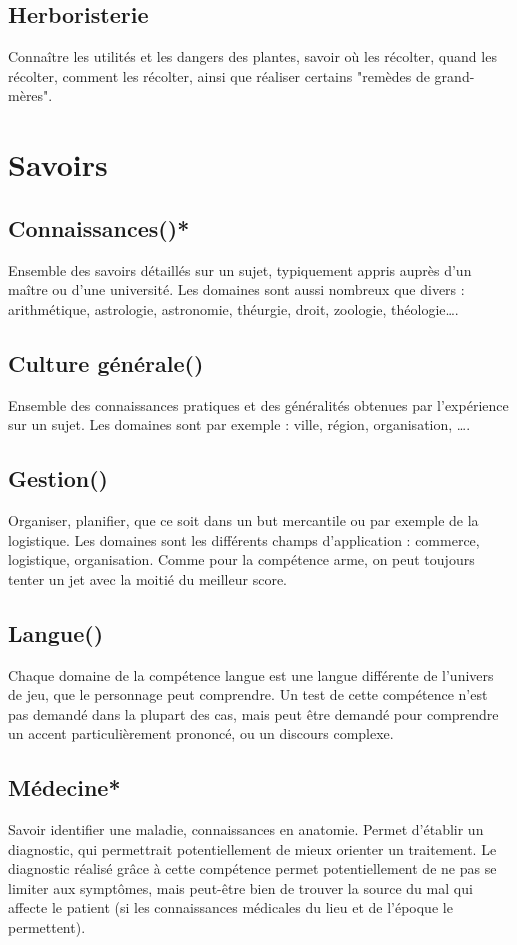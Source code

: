 \documentclass[10pt,a4paper,twocolumn]{book}
\begin{document}
\subsection*{Herboristerie}
Connaître les utilités et les dangers des plantes, savoir où les récolter, quand les récolter, comment les récolter, ainsi que réaliser certains "remèdes de grand-mères".

\section{Savoirs}
\subsection*{Connaissances()*}
Ensemble des savoirs détaillés sur un sujet, typiquement appris auprès d’un maître ou d’une université. Les domaines sont aussi nombreux que divers : arithmétique, astrologie, astronomie, théurgie, droit, zoologie, théologie….
\subsection*{Culture générale()}
Ensemble des connaissances pratiques et des généralités obtenues par l’expérience sur un sujet. Les domaines sont par exemple : ville, région, organisation, ….
\subsection*{Gestion()}
Organiser, planifier, que ce soit dans un but mercantile ou par exemple de la logistique. Les domaines sont les différents champs d’application : commerce, logistique, organisation.  Comme pour la compétence arme, on peut toujours tenter un jet avec la moitié du meilleur score.
\subsection*{Langue()}
Chaque domaine de la compétence langue est une langue différente de l’univers de jeu, que le personnage peut comprendre.
Un test de cette compétence n’est pas demandé dans la plupart des cas, mais peut être demandé pour comprendre un accent particulièrement prononcé, ou un discours complexe.
\subsection*{Médecine*}
Savoir identifier une maladie, connaissances en anatomie. Permet d'établir un diagnostic, qui permettrait potentiellement de mieux orienter un traitement. Le diagnostic réalisé grâce à cette compétence permet potentiellement de ne pas se limiter aux symptômes, mais peut-être bien de trouver la source du mal qui affecte le patient (si les connaissances médicales du lieu et de l'époque le permettent).
\end{document}
